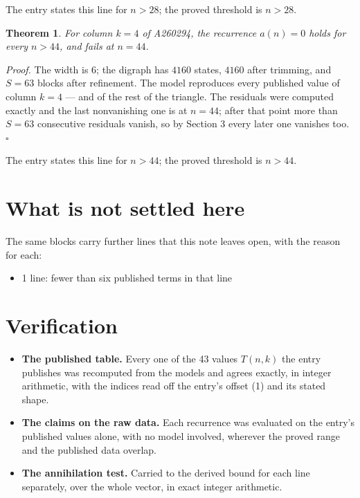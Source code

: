 \documentclass[11pt]{article}
\newtheorem{theorem}{Theorem}
\theoremstyle{definition}
\begin{document}
The entry states this line for $n > 28$; the proved threshold is $n > 28$.

\begin{theorem} For column $k = 4$ of A260294, the recurrence $a(n) = 0$ holds for every $n > 44$, and fails at $n = 44$.\end{theorem}

{\itshape Proof.} The width is $6$; the digraph has $4160$ states, $4160$ after trimming, and $S = 63$ blocks after refinement. The model reproduces every published value of column $k = 4$ --- and of the rest of the triangle. The residuals were computed exactly and the last nonvanishing one is at $n = 44$; after that point more than $S = 63$ consecutive residuals vanish, so by Section 3 every later one vanishes too. $\square$

The entry states this line for $n > 44$; the proved threshold is $n > 44$.

\section{What is not settled here}

The same blocks carry further lines that this note leaves open, with the reason for each:

\begin{itemize}

\item 1 line: fewer than six published terms in that line

\end{itemize}

\section{Verification}

\begin{itemize}

\item {\bfseries The published table.} Every one of the 43 values $T(n,k)$ the entry publishes was recomputed from the models and agrees exactly, in integer arithmetic, with the indices read off the entry's offset (1) and its stated shape.

\item {\bfseries The claims on the raw data.} Each recurrence was evaluated on the entry's published values alone, with no model involved, wherever the proved range and the published data overlap.

\item {\bfseries The annihilation test.} Carried to the derived bound for each line separately, over the whole vector, in exact integer arithmetic.

\end{itemize}
\end{document}
